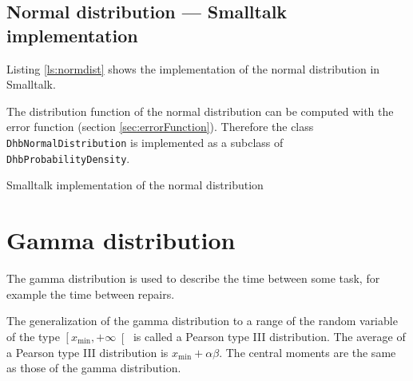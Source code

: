 \subsection{Normal distribution --- Smalltalk implementation}
 Listing \ref{ls:normdist} shows the
implementation of the normal distribution in Smalltalk.

The distribution function of the normal distribution can be
computed with the error function (\cf section
\ref{sec:errorFunction}). Therefore the class {\tt
DhbNormalDistribution} is implemented as a subclass of {\tt
DhbProbabilityDensity}.

\begin{listing} Smalltalk implementation of the normal distribution \label{ls:normdist}

\end{listing}

\section{Gamma distribution}
\label{sec:gammadist} The gamma distribution is used to describe
the time between some task, for example the time between repairs.

The generalization of the gamma distribution to a range of the
random variable of the type $\left[x_{\min},+\infty\right[$ is
called a Pearson type III distribution. The average of a Pearson
type III distribution is $x_{\min}+\alpha\beta$. The central
moments are the same as those of the gamma distribution.

